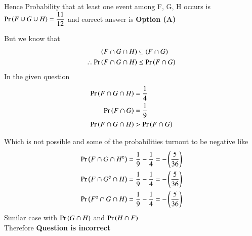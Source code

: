\documentclass[journal,12pt,twocolumn]{IEEEtran}
\begin{document}
Hence Probability that at least one event among F, G, H occurs is $\Pr\left(F \cup G \cup H\right)=\dfrac{11}{12}$ and correct answer is \textbf{Option (A)}
\null \par \null 
But we know that 
\begin{align*}
(F \cap G \cap H) &\subseteq (F \cap G) \\
\therefore \Pr\left(F \cap G \cap H\right) &\leq \Pr\left(F \cap G\right) 
\end{align*}
In the given question 
\begin{align*}
\Pr\left(F \cap G \cap H\right) &= \dfrac{1}{4} \\
\Pr\left(F \cap G\right)        &= \dfrac{1}{9} \\
\Pr\left(F \cap G \cap H\right) &> \Pr\left(F \cap G\right)
\end{align*}

Which is not possible and some of the probabilities turnout to be negative like 
\begin{align*}
\Pr\left(F \cap G \cap H^{\mathsf{c}}\right) &= \dfrac{1}{9} - \dfrac{1}{4} = -\left(\dfrac{5}{36}\right) \\
\Pr\left(F \cap G^{\mathsf{c}} \cap H\right) &= \dfrac{1}{9} - \dfrac{1}{4} = -\left(\dfrac{5}{36}\right) \\
\Pr\left(F^{\mathsf{c}} \cap G \cap H\right) &= \dfrac{1}{9} - \dfrac{1}{4} = -\left(\dfrac{5}{36}\right) 
\end{align*}
Similar case with $\Pr\left(G \cap H\right)$ and $\Pr\left(H \cap F\right)$ \\
Therefore \textbf{Question is incorrect}
\end{document}
